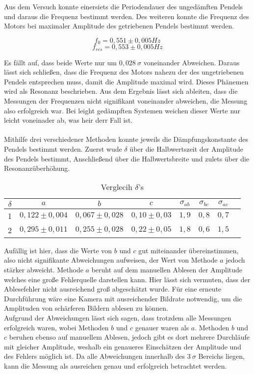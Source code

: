 Aus dem Versuch konnte einersiets die Periodendauer des ungedämften Pendels und daraus die Frequenz bestimmt werden.
Des weiteren konnte die Frequenz des Motors bei maximaler Amplitude des getriebenen Pendels bestimmt werden.

\[\boxed{f_0 = 0,551 \pm 0,005 \si{Hz}}\]
\[\boxed{f_{res} = 0,553 \pm 0,005 \si{Hz}}\]

Es fällt auf, dass beide Werte nur um $0,028\ \sigma$ voneinander Abweichen.
Daraus lässt sich schließen, dass die Frequenz des Motors nahezu der des ungetriebenen Pendels entsprechen muss, damit die Amplitude maximal wird.
Dieses Phänemen wird als Resonanz beschrieben. Aus dem Ergebnis lässt sich ableiten, dass die Messungen der Frequenzen nicht signifikant voneinander abweichen, die Messung also erfolgreich war.
Bei leight gedämpften Systemen weichen dieser Werte nur leicht voneinader ab, was heir derr Fall ist.
\\ \\


Mithilfe drei verschiedener Methoden konnte jeweils die Dämpfungskonstante des Pendels bestimmt werden.
Zuerst wude $\delta$ über die Halbwertszeit der Amplitude des Pendels bestimmt,
Anschließend über die Halbwertsbreite und zulets über die Resonanzüberhöhung.

\begin{table}[h!]
    \centering
    \begin{tabular}{c c c c c c c c}
        \hline
        $\delta$ & $a$ & $b$ & $c$ & $\sigma_{ab}$ & $\sigma_{bc}$ & $\sigma_{ac}$ \\
        \hline
        1 & $0,122 \pm 0,004$ & $0,067 \pm 0,028$ & $0,10 \pm 0,03$ & $1,9$ & $0,8$ & $0,7$ \\
        2 & $0,295 \pm 0,011$ & $0,255 \pm 0,028$ & $0,22 \pm 0,05$ & $1,8$ & $0,6$ & $1,5$ \\
        \hline

        
    \end{tabular}
    \caption{Verglecih $\delta$'s}
\end{table}

Aufällig ist hier, dass die Werte von $b$ und $c$ gut miteinander übereinstimmen, also nicht signifikante Abweichungen aufweisen, der Wert von Methode $a$ jedoch stärker abweicht.
Methode $a$ beruht auf dem manuellen Ablesen der Amplitude welches eine große Fehlerquelle darstellen kann.
Hier lässt sich vermuten, dass der Ablesefehler nicht ausreichend groß abgeschätzt wurde.
Für eine erneute Durchführung wäre eine Kamera mit ausreichender Bildrate notwendig, um die Amplituden
von schärferen Bildern ablesen zu können. \\
Aufgrund der Abweichungen lässt sich sagen, dass trotzdem alle Messungen erfolgreich waren, wobei Methoden $b$ und $c$ genauer waren als $a$.
Methoden $b$ und $c$ beruhen ebenso auf manuellem Ablesen, jedoch gibt es dort mehrere Durchläufe mit gleicher Amplitude, weshalb ein genaueres Einschätzen der Amplitude und des Fehlers möglich ist.
Da alle Abweichungen innerhalb des $3\ \sigma$ Bereichs liegen, kann die Messung als ausreichen genau und erfolgreich betrachtet werden.




